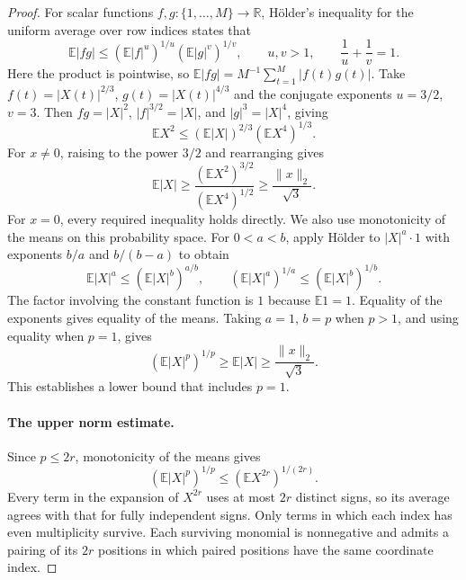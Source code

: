 \documentclass[10pt,a4paper]{amsart}
\newcommand{\E}{\mathbb E}
\newcommand{\R}{\mathbb R}
\begin{document}
\begin{proof}
For scalar functions $f,g:\{1,\ldots,M\}\to\R$, H\"older's inequality for the uniform average over row indices states that
\[
 \E|fg|\le(\E|f|^u)^{1/u}(\E|g|^v)^{1/v},
 \qquad u,v>1,\qquad \frac1u+\frac1v=1.
\]
Here the product is pointwise, so $\E|fg|=M^{-1}\sum_{t=1}^M|f(t)g(t)|$. Take $f(t)=|X(t)|^{2/3}$, $g(t)=|X(t)|^{4/3}$ and the conjugate exponents $u=3/2$, $v=3$. Then $fg=|X|^2$, $|f|^{3/2}=|X|$, and $|g|^3=|X|^4$, giving
\[
 \E X^2\le(\E|X|)^{2/3}(\E X^4)^{1/3}.
\]
For $x\ne0$, raising to the power $3/2$ and rearranging gives
\[
 \E|X|\ge\frac{(\E X^2)^{3/2}}{(\E X^4)^{1/2}}
 \ge\frac{\|x\|_2}{\sqrt3}.
\]
For $x=0$, every required inequality holds directly. We also use monotonicity of the means on this probability space. For $0<a<b$, apply H\"older to $|X|^a\cdot1$ with exponents $b/a$ and $b/(b-a)$ to obtain
\[
 \E|X|^a\le(\E|X|^b)^{a/b},
 \qquad (\E|X|^a)^{1/a}\le(\E|X|^b)^{1/b}.
\]
The factor involving the constant function is $1$ because $\E1=1$. Equality of the exponents gives equality of the means. Taking $a=1$, $b=p$ when $p>1$, and using equality when $p=1$, gives
\begin{equation}\label{eq:moment-lower}
 (\E|X|^p)^{1/p}\ge\E|X|\ge\frac{\|x\|_2}{\sqrt3}.
\end{equation}
This establishes a lower bound that includes $p=1$.

\paragraph{The upper norm estimate.}
Since $p\le2r$, monotonicity of the means gives
\[
 (\E|X|^p)^{1/p}\le(\E X^{2r})^{1/(2r)}.
\]
Every term in the expansion of $X^{2r}$ uses at most $2r$ distinct signs, so its average agrees with that for fully independent signs. Only terms in which each index has even multiplicity survive. Each surviving monomial is nonnegative and admits a pairing of its $2r$ positions in which paired positions have the same coordinate index.


\end{proof}
\end{document}
